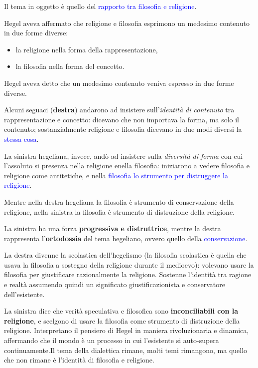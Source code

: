 \documentclass[a4paper, twoside, titlepage]{book}
\renewcommand{\emph}[1]{\textcolor{blue}{#1}}
\begin{document}
Il tema in oggetto è quello del \emph{rapporto tra filosofia e religione}.

Hegel aveva affermato che religione e filosofia esprimono un medesimo contenuto​ in due forme diverse:​
\begin{itemize}
\item la religione nella forma della rappresentazione,​
\item la filosofia nella forma del concetto.
\end{itemize}

Hegel aveva detto che un medesimo contenuto veniva espresso in due forme diverse.

Alcuni seguaci (\textbf{destra}) andarono ad insistere sull'\textit{identità di contenuto} tra rappresentazione e concetto: dicevano che non importava la forma, ma solo il contenuto; sostanzialmente religione e filosofia dicevano in due modi diversi la \emph{stessa cosa}.

La sinistra hegeliana, invece, andò ad insistere sulla \textit{diversità di forma} con cui l'assoluto si presenza nella religione enella filosofia: iniziarono a vedere filosofia e religione come antitetiche, e nella \emph{filosofia lo strumento per distruggere la religione}.

Mentre nella destra hegeliana la filosofia è strumento di conservazione della religione, nella sinistra la filosofia è strumento di distruzione della religione.

La sinistra ha una forza \textbf{progressiva e distruttrice}, mentre la destra rappresenta l'\textbf{ortodossia} del tema hegeliano, ovvero quello della \emph{conservazione}.

La destra divenne la scolastica dell'hegelismo (la filosofia scolastica è quella che usava la filosofia a sostegno della religione durante il medioevo): volevano usare la filosofia per giustificare razionalmente la religione. Sostenne l’identità tra ragione e realtà assumendo quindi un significato​ giustificazionista e conservatore dell’esistente.​

La sinistra dice che verità speculativa e filosofica sono \textbf{inconciliabili con la religione}, e scelgono di usare la filosofia come strumento di distruzione della religione.
Interpretano il pensiero di Hegel in maniera rivoluzionaria e dinamica, affermando che il mondo è​ un processo in cui​ l’esistente si auto-supera continuamente.​
Il tema della dialettica rimane, molti temi rimangono, ma quello che non rimane è l'identità di filosofia e religione.
\end{document}
